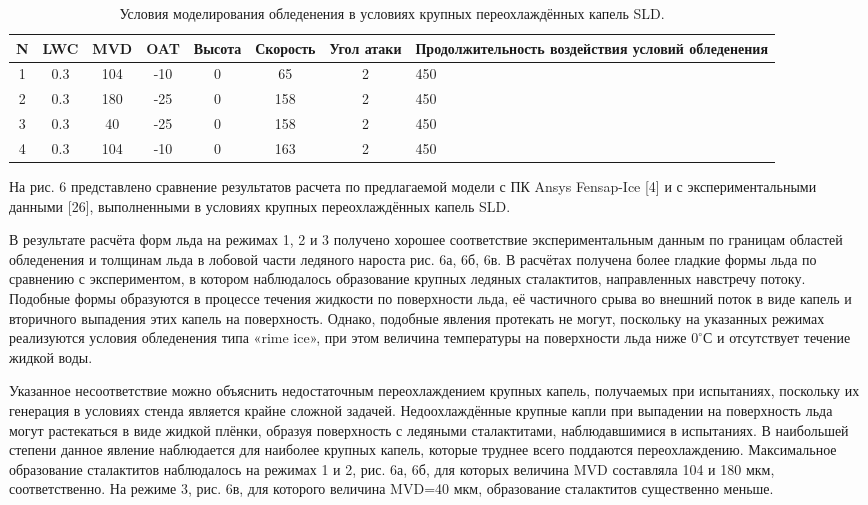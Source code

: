 \documentclass{psta}%
\begin{document}
\begin{table}\footnotesize
\caption{Условия моделирования обледенения в условиях крупных переохлаждённых капель SLD.}
\begin{tabular}{|c|c|c|c|c|c|c|m{40mm}|}
\hline
N & LWC & MVD & OAT & Высота & Скорость & Угол атаки & Продолжительность воздействия условий обледенения \\ 
\hline
1 & 0.3 & 104 & -10 & 0 & 65 & 2 & 450 \\
2 & 0.3 & 180 & -25 & 0 & 158 & 2 & 450 \\
3 & 0.3 & 40 & -25 & 0 & 158 & 2 & 450 \\
4 & 0.3 & 104 & -10 & 0 & 163 & 2 & 450 \\
\hline
\end{tabular}
\end{table}

На рис. 6 представлено сравнение результатов расчета по предлагаемой модели с ПК Ansys Fensap-Ice [4] и с экспериментальными данными [26], выполненными в условиях крупных переохлаждённых капель SLD.

В результате расчёта форм льда на режимах 1, 2 и 3 получено хорошее соответствие экспериментальным данным по границам областей обледенения и толщинам льда в лобовой части ледяного нароста рис. 6а, 6б, 6в.
В расчётах получена более гладкие формы льда по сравнению с экспериментом, в котором наблюдалось образование крупных ледяных сталактитов, направленных навстречу потоку.
Подобные формы образуются в процессе течения жидкости по поверхности льда, её частичного срыва во внешний поток в виде капель и вторичного выпадения этих капель на поверхность.
Однако, подобные явления протекать не могут, поскольку на указанных режимах реализуются условия обледенения типа «rime ice», при этом величина температуры на поверхности льда ниже $0^{\circ}С$ и отсутствует течение жидкой воды.
 
Указанное несоответствие можно объяснить недостаточным переохлаждением крупных капель, получаемых при испытаниях, поскольку их генерация в условиях стенда является крайне сложной задачей.
Недоохлаждённые крупные капли при выпадении на поверхность льда могут растекаться в виде жидкой плёнки, образуя поверхность с ледяными сталактитами, наблюдавшимися в испытаниях.
В наибольшей степени данное явление наблюдается для наиболее крупных капель, которые труднее всего поддаются переохлаждению.
Максимальное образование сталактитов наблюдалось на режимах 1 и 2, рис. 6а, 6б, для которых величина MVD составляла 104 и 180 мкм, соответственно.
На режиме 3, рис. 6в, для которого величина MVD=40 мкм, образование сталактитов существенно меньше. 
\end{document}
